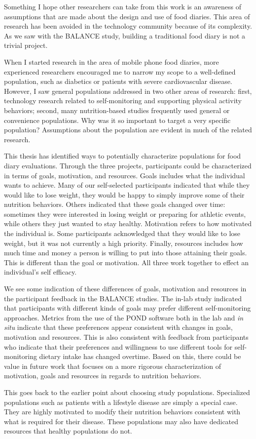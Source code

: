 Something I hope other researchers can take from this work is an awareness of assumptions that are made about the design and use of food diaries. This area of research has been avoided in the technology community because of its complexity. As we saw with the BALANCE study, building a traditional food diary is not a trivial project. 

When I started research in the area of mobile phone food diaries, more experienced researchers encouraged me to narrow my scope to a well-defined population, such as diabetics or patients with severe cardiovascular disease. However, I saw general populations addressed in two other areas of research: first, technology research related to self-monitoring and supporting physical activity behaviors; second, many nutrition-based studies frequently used general or convenience populations. Why was it so important to target a very specific population? Assumptions about the population are evident in much of the related research. 

This thesis has identified ways to potentially characterize populations for food diary evaluations. Through the three projects, participants could be characterized in terms of goals, motivation, and resources. Goals includes what the individual wants to achieve. Many of our self-selected participants indicated that while they would like to lose weight, they would be happy to simply improve some of their nutrition behaviors. Others indicated that these goals changed over time: sometimes they were interested in losing weight or preparing for athletic events, while others they just wanted to stay healthy.   Motivation refers to how motivated the individual is. Some participants acknowledged that they would like to lose weight, but it was not currently a high priority. Finally, resources includes how much time and money a person is willing to put into those attaining their goals. This is different than the goal or motivation. All three work together to effect an individual's self efficacy. 

We see some indication of these differences of goals, motivation and resources in the participant feedback in the BALANCE studies. The in-lab study indicated that participants with different kinds of goals may prefer different self-monitoring approaches. Metrics from the use of the POND software both in the lab and \textit{in situ} indicate that these preferences appear consistent with changes in goals, motivation and resources. This is also consistent with feedback from participants who indicate that their preferences and willingness to use different tools for self-monitoring dietary intake has changed overtime. Based on this, there could be value in future work that focuses on a more rigorous characterization of motivation, goals and resources in regards to nutrition behaviors. 

This goes back to the earlier point about choosing study populations. Specialized populations such as patients with a lifestyle disease are simply a special case. They are highly motivated to modify their nutrition behaviors consistent with what is required for their disease. These populations may also have dedicated resources that healthy populations do not. 

